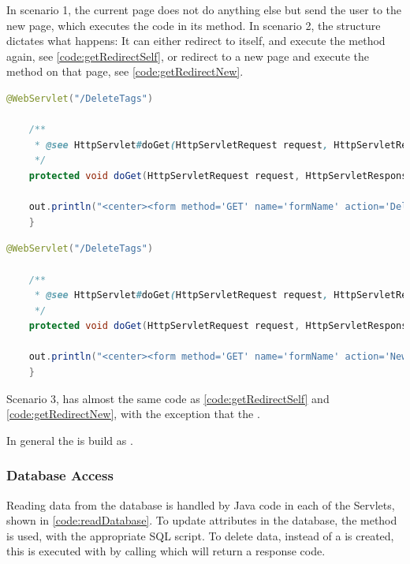 In scenario 1, the current page does not do anything else but send the user to the new page, which executes the code in its  method. In scenario 2, the  structure dictates what happens: It can either redirect to itself, and execute the  method again, see \autoref{code:getRedirectSelf}, or redirect to a new page and execute the  method on that page, see \autoref{code:getRedirectNew}.

\begin{lstlisting}[language=Java,label=code:getRedirectSelf,caption=A \code{form} which redirect to its own get method]
	@WebServlet("/DeleteTags")
	
	/**
	 * @see HttpServlet#doGet(HttpServletRequest request, HttpServletResponse response)
	 */
	protected void doGet(HttpServletRequest request, HttpServletResponse response) throws ServletException, IOException {
	
	out.println("<center><form method='GET' name='formName' action='DeleteTags'>");
	}
\end{lstlisting}

\begin{lstlisting}[language=Java,label=code:getRedirectNew,caption=A \code{form} which redirect to another page]
	@WebServlet("/DeleteTags")
	
	/**
	 * @see HttpServlet#doGet(HttpServletRequest request, HttpServletResponse response)
	 */
	protected void doGet(HttpServletRequest request, HttpServletResponse response) throws ServletException, IOException {
	
	out.println("<center><form method='GET' name='formName' action='NewPage'>");
	}
\end{lstlisting}

Scenario 3, has almost the same code as \autoref{code:getRedirectSelf} and \autoref{code:getRedirectNew}, with the exception that the .

In general the  is build as .

\subsubsection{Database Access}
Reading data from the database is handled by Java code in each of the Servlets, shown in \autoref{code:readDatabase}.
To update attributes in the database, the  method is used, with the appropriate SQL script.
To delete data, instead of  a  is created, this is executed with by calling  which will return a response code. 

